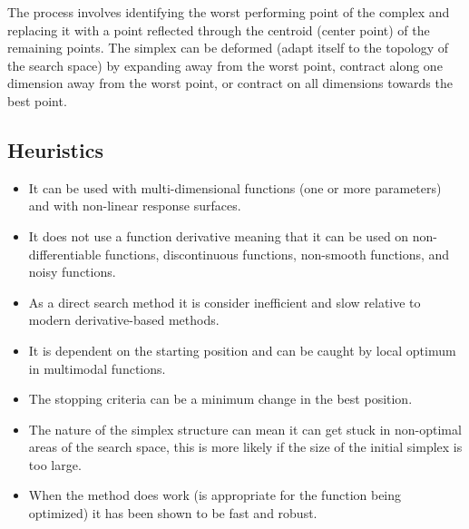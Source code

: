 The process involves identifying the worst performing point of the complex and replacing it with a point reflected through the centroid (center point) of the remaining points. The simplex can be deformed (adapt itself to the topology of the search space) by expanding away from the worst point, contract along one dimension away from the worst point, or contract on all dimensions towards the best point.

\subsection{Heuristics}

\begin{itemize}
	\item It can be used with multi-dimensional functions (one or more parameters) and with non-linear response surfaces.
	\item It does not use a function derivative meaning that it can be used on non-differentiable functions, discontinuous functions, non-smooth functions, and noisy functions.
	\item As a direct search method it is consider inefficient and slow relative to modern derivative-based methods.
	\item It is dependent on the starting position and can be caught by local optimum in multimodal functions.
	\item The stopping criteria can be a minimum change in the best position. 
	\item The nature of the simplex structure can mean it can get stuck in non-optimal areas of the search space, this is more likely if the size of the initial simplex is too large.
	\item When the method does work (is appropriate for the function being optimized) it has been shown to be fast and robust.
\end{itemize}

